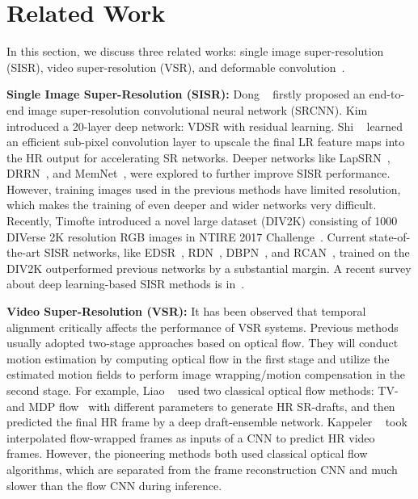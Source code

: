 \documentclass[10pt,twocolumn,letterpaper]{article}
\begin{document}
\section{Related Work}

In this section, we discuss three related works: single image super-resolution (SISR), video super-resolution (VSR), and deformable convolution~\cite{Dai_2017_ICCV}.

\vspace{2mm}
\noindent \textbf{Single Image Super-Resolution (SISR):}
Dong \etal~\cite{dong2014learning} firstly proposed an end-to-end image super-resolution convolutional neural network (SRCNN). Kim \etal~\cite{kim2016accurate} introduced a 20-layer deep network: VDSR with residual learning. Shi \etal~\cite{shi2016real} learned an efficient sub-pixel convolution layer to upscale the final LR feature maps into the HR output for accelerating SR networks. Deeper networks like LapSRN~\cite{lai2017deep}, DRRN~\cite{tai2017image}, and MemNet~\cite{tai2017memnet}, were explored to further improve SISR performance. However, training images used in the previous methods have limited resolution, which makes the training of even deeper and wider networks very difficult. Recently, Timofte \etal introduced a novel large dataset (DIV2K) consisting of 1000 DIVerse 2K resolution RGB images in NTIRE 2017 Challenge~\cite{timofte2017ntire}. Current state-of-the-art SISR networks, like EDSR~\cite{lim2017enhanced}, RDN~\cite{zhang2018residual}, DBPN~\cite{haris2018deep}, and RCAN~\cite{zhang2018image}, trained on the DIV2K outperformed previous networks by a substantial margin. A recent survey about deep learning-based SISR methods is in~\cite{yang2018deep}.

\vspace{2mm}
\noindent \textbf{Video Super-Resolution (VSR):}
It has been observed that temporal alignment critically affects the performance of VSR systems. Previous methods usually adopted two-stage approaches based on optical flow. They will conduct motion estimation by computing optical flow in the first stage and utilize the estimated motion fields to perform image wrapping/motion compensation in the second stage. For example, Liao \etal~\cite{Liao_2015_ICCV} used two classical optical flow methods: TV- and MDP flow~\cite{xu2012motion} with different parameters to generate HR SR-drafts, and then predicted the final HR frame by a deep draft-ensemble network. Kappeler \etal~\cite{kappeler2016video} took interpolated flow-wrapped frames as inputs of a CNN to predict HR video frames. However, the pioneering methods both used classical optical flow algorithms, which are separated from the frame reconstruction CNN and much slower than the flow CNN during inference.
\end{document}
